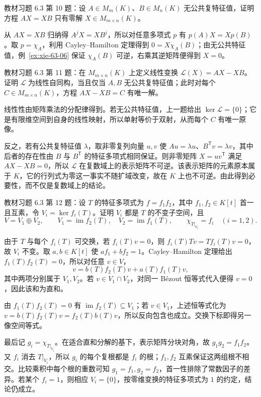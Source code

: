 \begin{example}
\label{ex:xie-63-10}
教材习题 6.3 第 10 题：设 $A\in M_m(K)$、$B\in M_n(K)$ 无公共复特征值，证明方程 $AX=XB$ 只有零解 $X\in M_{m\times n}(K)$。
\end{example}
\begin{solve}
从 $AX=XB$ 归纳得 $A^jX=XB^j$，所以对任意多项式 $p$ 有 $p(A)X=Xp(B)$。取 $p=\chi_A$，利用 Cayley--Hamilton 定理得到 $0=X\chi_A(B)$；由无公共特征值，例~\ref{ex:xie-63-06} 保证 $\chi_A(B)$ 可逆，右乘其逆矩阵便得到 $X=0$。
\end{solve}

\begin{example}
\label{ex:xie-63-11}
教材习题 6.3 第 11 题：在 $M_{m\times n}(K)$ 上定义线性变换 $\mathcal L(X)=AX-XB$。证明 $\mathcal L$ 为线性自同构，当且仅当 $A,B$ 无公共复特征值；此时对每个 $C\in M_{m\times n}(K)$，方程 $AX-XB=C$ 有唯一解。
\end{example}
\begin{solve}
线性性由矩阵乘法的分配律得到。若无公共特征值，上一题给出 $\ker\mathcal L=\{0\}$；它是有限维空间到自身的线性映射，所以单射等价于双射，从而每个 $C$ 有唯一原像。

反之，若有公共复特征值 $\lambda$，取非零复列向量 $u,v$ 使 $Au=\lambda u$、$B^{\mathsf T}v=\lambda v$，其中后者的存在性由 $B$ 与 $B^{\mathsf T}$ 的特征多项式相同保证。则非零矩阵 $X=uv^{\mathsf T}$ 满足 $AX-XB=0$，所以 $\mathcal L$ 在复数域上的表示矩阵不可逆。该表示矩阵的元素原本属于 $K$，它的行列式为零这一事实不随扩域改变，故在 $K$ 上也不可逆。由此得到必要性，而不仅是复数域上的结论。
\end{solve}

\begin{example}
\label{ex:xie-63-12}
教材习题 6.3 第 12 题：设 $T$ 的特征多项式为 $f=f_1f_2$，其中 $f_1,f_2\in K[t]$ 首一且互素，令 $V_i=\ker f_i(T)$。证明 $V_i$ 都是 $T$ 的不变子空间，且
\[
 V=V_1\oplus V_2,\qquad V_1=\operatorname{im}f_2(T),\quad
 V_2=\operatorname{im}f_1(T),\qquad
 \chi_{T|_{V_i}}=f_i\quad(i=1,2).
\]
\end{example}
\begin{solve}
由于 $T$ 与每个 $f_i(T)$ 可交换，若 $f_i(T)v=0$，则 $f_i(T)Tv=T f_i(T)v=0$，故 $V_i$ 不变。取 $a,b\in K[t]$ 使 $af_1+bf_2=1$。Cayley--Hamilton 定理给出 $f_1(T)f_2(T)=0$，所以对任意 $v\in V$，
\[
 v=b(T)f_2(T)v+a(T)f_1(T)v,
\]
其中两项分别属于 $V_1,V_2$。若 $v\in V_1\cap V_2$，对同一 Bézout 恒等式代入便得 $v=0$，因此该和为直和。

由 $f_1(T)f_2(T)=0$ 有 $\operatorname{im}f_2(T)\subseteq V_1$；若 $v\in V_1$，上述恒等式化为 $v=b(T)f_2(T)v=f_2(T)b(T)v$，所以反向包含也成立。交换下标即得另一像空间等式。

最后记 $g_i=\chi_{T|_{V_i}}$。在适合直和分解的基下，表示矩阵分块对角，故 $g_1g_2=f_1f_2$。又 $f_i$ 消去 $T|_{V_i}$，所以 $g_i$ 的每个复根都是 $f_i$ 的根；$f_1,f_2$ 互素保证这两组根不相交。比较乘积中每个根的重数可知 $g_1=f_1,g_2=f_2$，首一性排除了常数因子的差异。若某个 $f_i=1$，则相应 $V_i=\{0\}$，按零维变换的特征多项式为 $1$ 的约定，结论仍成立。
\end{solve}

